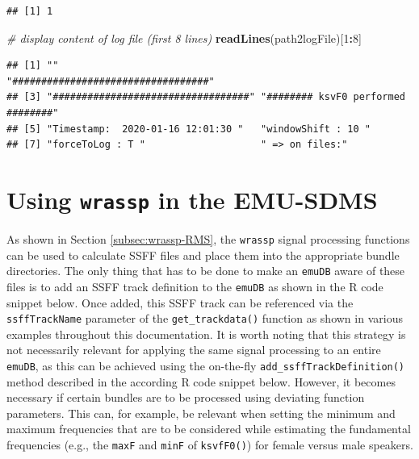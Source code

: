 \documentclass[]{book}
\newenvironment{Shaded}{\begin{snugshade}}{\end{snugshade}}
\newcommand{\CommentTok}[1]{\textcolor[rgb]{0.56,0.35,0.01}{\textit{#1}}}
\newcommand{\DecValTok}[1]{\textcolor[rgb]{0.00,0.00,0.81}{#1}}
\newcommand{\KeywordTok}[1]{\textcolor[rgb]{0.13,0.29,0.53}{\textbf{#1}}}
\newcommand{\NormalTok}[1]{#1}
\newcommand{\OperatorTok}[1]{\textcolor[rgb]{0.81,0.36,0.00}{\textbf{#1}}}
\begin{document}
\begin{verbatim}
## [1] 1
\end{verbatim}

\begin{Shaded}
\begin{Highlighting}[]
\CommentTok{# display content of log file (first 8 lines)}
\KeywordTok{readLines}\NormalTok{(path2logFile)[}\DecValTok{1}\OperatorTok{:}\DecValTok{8}\NormalTok{]}
\end{Highlighting}
\end{Shaded}

\begin{verbatim}
## [1] ""                                   "##################################"
## [3] "##################################" "######## ksvF0 performed ########" 
## [5] "Timestamp:  2020-01-16 12:01:30 "   "windowShift : 10 "                 
## [7] "forceToLog : T "                    " => on files:"
\end{verbatim}

\hypertarget{sec:wrassp-emu-sdms}{%
\section{\texorpdfstring{Using \texttt{wrassp} in the EMU-SDMS}{Using wrassp in the EMU-SDMS}}\label{sec:wrassp-emu-sdms}}

As shown in Section \ref{subsec:wrassp-RMS}, the \texttt{wrassp} signal processing functions can be used to calculate SSFF files and place them into the appropriate bundle directories. The only thing that has to be done to make an \texttt{emuDB} aware of these files is to add an SSFF track definition to the \texttt{emuDB} as shown in the R code snippet below. Once added, this SSFF track can be referenced via the \texttt{ssffTrackName} parameter of the \texttt{get\_trackdata()} function as shown in various examples throughout this documentation. It is worth noting that this strategy is not necessarily relevant for applying the same signal processing to an entire \texttt{emuDB}, as this can be achieved using the on-the-fly \texttt{add\_ssffTrackDefinition()} method described in the according R code snippet below. However, it becomes necessary if certain bundles are to be processed using deviating function parameters. This can, for example, be relevant when setting the minimum and maximum frequencies that are to be considered while estimating the fundamental frequencies (e.g., the \texttt{maxF} and \texttt{minF} of \texttt{ksvfF0()}) for female versus male speakers.
\end{document}

